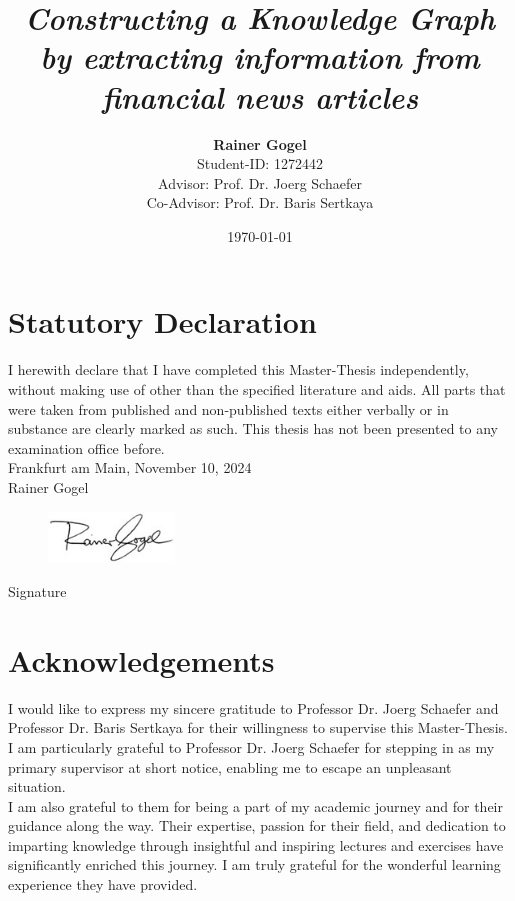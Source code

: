 \documentclass[
DIV=calc,
a4paper,
fontsize=12pt
]{scrreprt}   %
\title{\Huge \emph{Constructing a Knowledge Graph by extracting information from financial news articles}}
\author{\textbf{Rainer Gogel}\\ \normalsize{Student-ID: 1272442} \\[2cm]{Advisor: Prof. Dr. Joerg Schaefer}\\{Co-Advisor: Prof. Dr. Baris Sertkaya}\\[3cm]}
\date{\today}
\begin{document}
\maketitle



\chapter*{Statutory Declaration}
I herewith declare that I have completed this Master-Thesis independently, without making use of other than the specified literature and aids.
All parts that were taken from published and non-published texts either verbally or in substance are clearly marked as such.
This thesis has not been presented to any examination office before.\\


Frankfurt am Main, November 10, 2024\\


Rainer Gogel\\



\begin{figure}[H]
	\includegraphics[width=0.3\textwidth]{Assets/signature}
\end{figure}
Signature

\chapter*{Acknowledgements}
I would like to express my sincere gratitude to Professor Dr. Joerg Schaefer and Professor Dr. Baris Sertkaya for their willingness to supervise this Master-Thesis.
I am particularly grateful to Professor Dr. Joerg Schaefer for stepping in as my primary supervisor at short notice, enabling me to escape an unpleasant situation.\\

I am also grateful to them for being a part of my academic journey and for their guidance along the way.
Their expertise, passion for their field, and dedication to imparting knowledge through insightful and inspiring lectures and exercises have significantly enriched this journey.
I am truly grateful for the wonderful learning experience they have provided.
\end{document}
